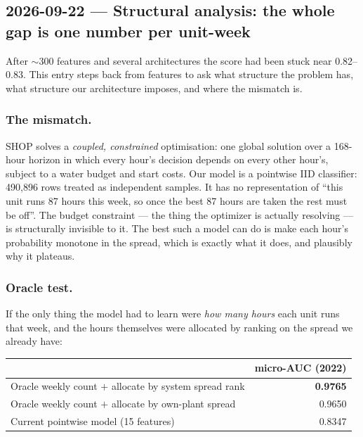 \subsection{2026-09-22 --- Structural analysis: the whole gap is one number per unit-week}
\label{sec:oracle}

After $\sim$300 features and several architectures the score had been stuck near 0.82--0.83. This
entry steps back from features to ask what structure the problem has, what structure our
architecture imposes, and where the mismatch is.

\subsubsection*{The mismatch.}
SHOP solves a \emph{coupled, constrained} optimisation: one global solution over a 168-hour
horizon in which every hour's decision depends on every other hour's, subject to a water budget
and start costs. Our model is a pointwise IID classifier: 490{,}896 rows treated as independent
samples. It has no representation of ``this unit runs 87 hours this week, so once the best 87
hours are taken the rest must be off''. The budget constraint --- the thing the optimizer is
actually resolving --- is structurally invisible to it. The best such a model can do is make each
hour's probability monotone in the spread, which is exactly what it does, and plausibly why it
plateaus.

\subsubsection*{Oracle test.}
If the only thing the model had to learn were \emph{how many hours} each unit runs that week, and
the hours themselves were allocated by ranking on the spread we already have:

\begin{center}
\begin{tabular}{lr}
\toprule
 & micro-AUC (2022) \\
\midrule
Oracle weekly count $+$ allocate by system spread rank   & \textbf{0.9765} \\
Oracle weekly count $+$ allocate by own-plant spread     & 0.9650 \\
Current pointwise model (15 features)                    & 0.8347 \\
\bottomrule
\end{tabular}
\end{center}


